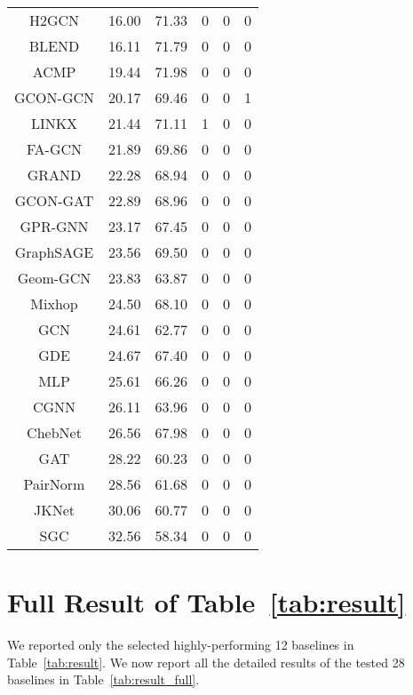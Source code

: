 \documentclass{article}
\theoremstyle{plain}
\theoremstyle{definition}
\theoremstyle{remark}
\begin{document}
\begin{table}[ht]
\begin{tabular}{c cc ccc}
        H2GCN	 & 16.00  & 71.33 & 0 & 0 & 0\\
        BLEND	 & 16.11  & 71.79 & 0 & 0 & 0\\
        ACMP     & 19.44  & 71.98 & 0 & 0 & 0\\
        GCON-GCN & 20.17  & 69.46 & 0 & 0 & 1\\
        LINKX	 & 21.44  & 71.11 & 1 & 0 & 0\\
        FA-GCN	 & 21.89  & 69.86 & 0 & 0 & 0\\
        GRAND    & 22.28  & 68.94 & 0 & 0 & 0\\
        GCON-GAT & 22.89  & 68.96 & 0 & 0 & 0\\
        GPR-GNN	 & 23.17  & 67.45 & 0 & 0 & 0\\
        GraphSAGE& 23.56  & 69.50 & 0 & 0 & 0\\
        Geom-GCN & 23.83  & 63.87 & 0 & 0 & 0\\
        Mixhop	 & 24.50  & 68.10 & 0 & 0 & 0\\
        GCN      & 24.61  & 62.77 & 0 & 0 & 0\\
        GDE      & 24.67  & 67.40 & 0 & 0 & 0\\
        MLP      & 25.61  & 66.26 & 0 & 0 & 0\\
        CGNN     & 26.11  & 63.96 & 0 & 0 & 0\\
        ChebNet  & 26.56  & 67.98 & 0 & 0 & 0\\
        GAT      & 28.22  & 60.23 & 0 & 0 & 0\\
        PairNorm & 28.56  & 61.68 & 0 & 0 & 0\\
        JKNet    & 30.06  & 60.77 & 0 & 0 & 0\\
        SGC      & 32.56  & 58.34 & 0 & 0 & 0\\
        \bottomrule
    \end{tabular}
    \label{tab:summary_full}
\end{table}

\clearpage

\section{Full Result of Table~\ref{tab:result}}\label{a:full}
We reported only the selected highly-performing 12 baselines in Table~\ref{tab:result}. We now report all the detailed results of the tested 28 baselines in Table~\ref{tab:result_full}.
\end{document}
